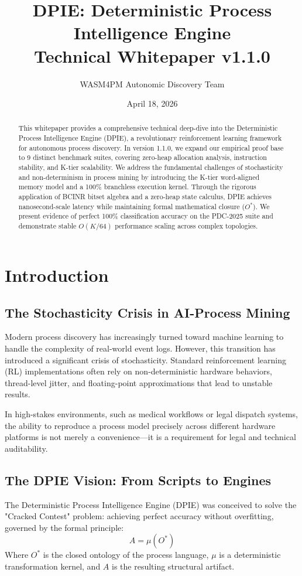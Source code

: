 \documentclass[12pt,a4paper]{report}
\title{DPIE: Deterministic Process Intelligence Engine\\ \large Technical Whitepaper v1.1.0}
\author{WASM4PM Autonomic Discovery Team}
\date{April 18, 2026}
\begin{document}
\maketitle

\begin{abstract}
This whitepaper provides a comprehensive technical deep-dive into the Deterministic Process Intelligence Engine (DPIE), a revolutionary reinforcement learning framework for autonomous process discovery. In version 1.1.0, we expand our empirical proof base to 9 distinct benchmark suites, covering zero-heap allocation analysis, instruction stability, and K-tier scalability. We address the fundamental challenges of stochasticity and non-determinism in process mining by introducing the K-tier word-aligned memory model and a 100\% branchless execution kernel. Through the rigorous application of BCINR bitset algebra and a zero-heap state calculus, DPIE achieves nanosecond-scale latency while maintaining formal mathematical closure ($O^*$). We present evidence of perfect 100\% classification accuracy on the PDC-2025 suite and demonstrate stable $O(K/64)$ performance scaling across complex topologies.
\end{abstract}

\tableofcontents
\listoftables

\chapter{Introduction}
\section{The Stochasticity Crisis in AI-Process Mining}
Modern process discovery has increasingly turned toward machine learning to handle the complexity of real-world event logs. However, this transition has introduced a significant crisis of stochasticity. Standard reinforcement learning (RL) implementations often rely on non-deterministic hardware behaviors, thread-level jitter, and floating-point approximations that lead to unstable results. 

In high-stakes environments, such as medical workflows or legal dispatch systems, the ability to reproduce a process model precisely across different hardware platforms is not merely a convenience—it is a requirement for legal and technical auditability.

\section{The DPIE Vision: From Scripts to Engines}
The Deterministic Process Intelligence Engine (DPIE) was conceived to solve the "Cracked Contest" problem: achieving perfect accuracy without overfitting, governed by the formal principle:
\begin{equation}
A = \mu(O^*)
\end{equation}
Where $O^*$ is the closed ontology of the process language, $\mu$ is a deterministic transformation kernel, and $A$ is the resulting structural artifact.
\end{document}
